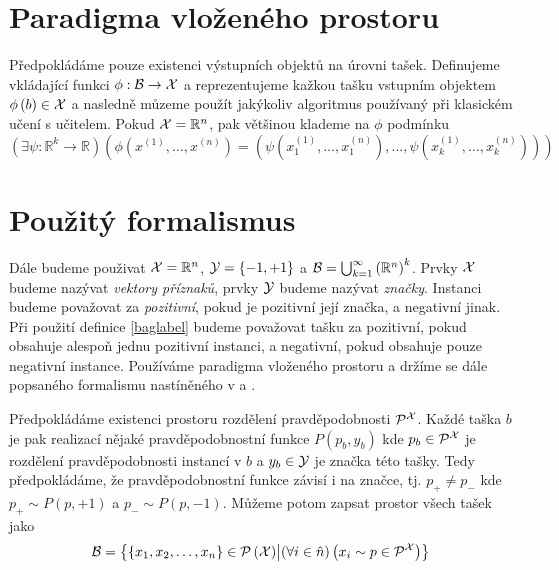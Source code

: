 \section{Paradigma vloženého prostoru}
Předpokládáme pouze existenci výstupních objektů na úrovni tašek. Definujeme vkládající funkci \( \phi : \mathcal B \to \mathcal X \) a reprezentujeme kažkou tašku vstupním objektem \( \phi \left( b \right) \in \mathcal X \) a nasledně můzeme použít jakýkoliv algoritmus používaný při klasickém učení s učitelem. Pokud \( \mathcal X = \mathbb R^n \), pak většinou klademe na \( \phi \) podmínku
\begin{equation}
	\left( \exists \psi : \mathbb R^k \to \mathbb R \right) \left( \phi \left( x^{(1)}, \dots, x^{(n)} \right) = \left( \psi \left( x_1^{(1)}, \dots, x_1^{(n)} \right), \dots, \psi \left( x_k^{(1)}, \dots, x_k^{(n)} \right) \right) \right)
\end{equation}

\section{Použitý formalismus}\label{used_formalism}
Dále budeme použivat \( \mathcal X = \mathbb R^n \), \( \mathcal Y = \left\{ -1, +1 \right\} \) a \( \mathcal B = \bigcup_{k = 1}^{\infty} \left( \mathbb R^n \right) ^k \). Prvky \( \mathcal X \) budeme nazývat \textit{vektory příznaků}, prvky \( \mathcal Y \) budeme nazývat \textit{značky}. Instanci budeme považovat za \textit{pozitivní}, pokud je pozitivní její značka, a negativní jinak. Při použití definice \eqref{baglabel} budeme považovat tašku za pozitivní, pokud obsahuje alespoň jednu pozitivní instanci, a negativní, pokud obsahuje pouze negativní instance. Používáme paradigma vloženého prostoru a držíme se dále popsaného formalismu nastíněného v \cite{pevny_using_2016} a \cite{pevny_discriminative_2016}.

Předpokládáme existenci prostoru rozdělení pravděpodobnosti \( \mathcal P^{\mathcal X} \). Každé taška \( b \) je pak realizací nějaké pravděpodobnostní funkce \( P \left( p_b, y_b \right) \) kde \( p_b \in \mathcal P^{\mathcal X} \) je rozdělení pravděpodobnosti instancí v \( b \) a \( y_b \in \mathcal Y \) je značka této tašky. Tedy předpokládáme, že pravděpodobnostní funkce závisí i na značce, tj. \( p_+ \neq p_- \) kde \( p_+ \sim P(p, +1) \) a \( p_- \sim P(p, -1) \). Můžeme potom zapsat prostor všech tašek jako
\begin{equation}
	\mathcal B = \left\{ \left\{ x_1, x_2, \dots, x_n \right\} \in \mathcal P \left( \mathcal X \right) \middle| \left( \forall i \in \hat n \right) \left( x_i \sim p \in \mathcal P^{\mathcal X} \right) \right\}
\end{equation}


